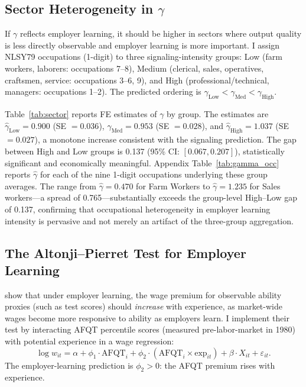 \documentclass[12pt]{article}
\theoremstyle{definition}
\theoremstyle{remark}
\begin{document}
\subsection{Sector Heterogeneity in $\gamma$}
\label{sec:hetero}

If $\gamma$ reflects employer learning, it should be higher in sectors where output quality
is less directly observable and employer learning is more important. I assign NLSY79 occupations
(1-digit) to three signaling-intensity groups: Low (farm workers, laborers: occupations 7--8),
Medium (clerical, sales, operatives, craftsmen, service: occupations 3--6, 9), and High
(professional/technical, managers: occupations 1--2). The predicted ordering is
$\gamma_{\text{Low}} < \gamma_{\text{Med}} < \gamma_{\text{High}}$.

Table~\ref{tab:sector} reports FE estimates of $\gamma$ by group. The estimates are
$\hat{\gamma}_{\text{Low}} = 0.900$ (SE $= 0.036$), $\hat{\gamma}_{\text{Med}} = 0.953$
(SE $= 0.028$), and $\hat{\gamma}_{\text{High}} = 1.037$ (SE $= 0.027$), a monotone increase
consistent with the signaling prediction. The gap between High and Low groups is 0.137 (95\%
CI: $[0.067, 0.207]$), statistically significant and economically meaningful.
Appendix Table~\ref{tab:gamma_occ} reports $\hat{\gamma}$ for each of the nine 1-digit
occupations underlying these group averages. The range from $\hat{\gamma} = 0.470$ for Farm
Workers to $\hat{\gamma} = 1.235$ for Sales workers---a spread of 0.765---substantially
exceeds the group-level High--Low gap of 0.137, confirming that occupational heterogeneity
in employer learning intensity is pervasive and not merely an artifact of the three-group
aggregation.

\subsection{The Altonji--Pierret Test for Employer Learning}
\label{sec:ap_test}

\citet{altonji2001employer} show that under employer learning, the wage premium for observable
ability proxies (such as test scores) should \emph{increase} with experience, as market-wide
wages become more responsive to ability as employers learn. I implement their test by
interacting AFQT percentile scores (measured pre-labor-market in 1980) with potential
experience in a wage regression:
\begin{equation}
\label{eq:ap}
\log w_{it} = \alpha + \phi_1 \cdot \text{AFQT}_i + \phi_2 \cdot (\text{AFQT}_i \times \text{exp}_{it})
+ \beta \cdot X_{it} + \varepsilon_{it}.
\end{equation}
The employer-learning prediction is $\phi_2 > 0$: the AFQT premium rises with experience.
\end{document}
